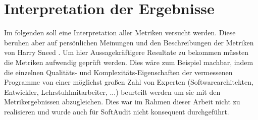 \documentclass[gb,ngerman]{stthesis}
\begin{document}
		\section{Interpretation der Ergebnisse}
			Im folgenden soll eine Interpretation aller Metriken versucht werden. Diese beruhen aber auf persönlichen Meinungen und den Beschreibungen der Metriken von Harry Sneed \cite{SoftwareInZahlen}. Um hier Aussagekräftigere Resultate zu bekommen müssten die Metriken aufwendig geprüft werden. Dies wäre zum Beispiel machbar, indem die einzelnen Qualitäts- und Komplexitäts-Eigenschaften der vermessenen Programme von einer möglichst großen Zahl von Experten (Softwarearchitekten, Entwickler, Lehrstuhlmitarbeiter, ...) beurteilt werden um sie mit den Metrikergebnissen abzugleichen. Dies war im Rahmen dieser Arbeit nicht zu realisieren und wurde auch für SoftAudit nicht konsequent durchgeführt.
\end{document}
